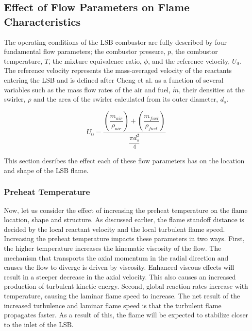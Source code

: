 
\subsection{Effect of Flow Parameters on Flame Characteristics}

The operating conditions of the LSB combustor are fully described by four fundamental flow parameters; the combustor pressure, \(p\), the combustor temperature, \(T\), the mixture equivalence ratio, \(\phi\), and the reference velocity, \(U_0\).
The reference velocity represents the mass-averaged velocity of the reactants entering the LSB and is defined after Cheng et al.\cite{2000-cheng} as a function of several variables such as the mass flow rates of the air and fuel, \(\dot{m}\), their densities at the swirler, \(\rho\) and the area of the swirler calculated from its outer diameter, \(d_s\).

\begin{equation}
U_0 = \frac{ \left( \dfrac{ \dot{m}_{air} }{ \rho_{air} } \right) + \left( \dfrac{ \dot{m}_{fuel} }{ \rho_{fuel} }\right) }{ \dfrac{\pi d_s^2 }{4} }
\label{eqn:referenceVelocity}
\end{equation}

This section desribes the effect each of these flow parameters has on the location and shape of the LSB flame.

\subsubsection{Preheat Temperature}

Now, let us consider the effect of increasing the preheat temperature on the flame location, shape and structure.
As discussed earlier, the flame standoff distance is decided by the local reactant velocity and the local turbulent flame speed.
Increasing the preheat temperature impacts these parameters in two ways.
First, the higher temperature increases the kinematic viscosity of the flow.
The mechanism that transports the axial momentum in the radial direction and causes the flow to diverge is driven by viscosity.
Enhanced viscous effects will result in a steeper decrease in the axial velocity.
This also causes an increased production of turbulent kinetic energy.
Second, global reaction rates increase with temperature, causing the laminar flame speed to increase.
The net result of the increased turbulence and laminar flame speed is that the turbulent flame propagates faster.
As a result of this, the flame will be expected to stabilize closer to the inlet of the LSB.

